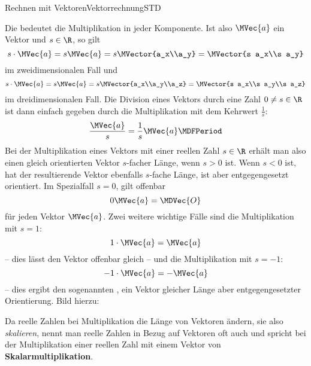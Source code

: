 \begin{MXContent}{Rechnen mit Vektoren}{Vektorrechnung}{STD}
\begin{MInfo}
Die  bedeutet die Multiplikation in jeder Komponente. Ist also $\MVec{a}$ ein Vektor und $s\in\R$, so gilt
\[
 s\cdot\MVec{a} = s\MVec{a}=s\MVector{a_x\\a_y} = \MVector{s a_x\\s a_y}
\]
im zweidimensionalen Fall und
\[
 s\cdot\MVec{a} = s\MVec{a}=s\MVector{a_x\\a_y\\a_z} = \MVector{s a_x\\s a_y\\s a_z}
\]
im dreidimensionalen Fall. Die Division eines Vektors durch eine Zahl $0\neq s\in\R$ ist dann einfach gegeben durch die Multiplikation mit dem Kehrwert $\frac{1}{s}$:
\[
 \frac{\MVec{a}}{s}=\frac{1}{s}\MVec{a}\MDFPeriod 
\]
Bei der Multiplikation eines Vektors mit einer reellen Zahl $s\in\R$ erhält man also einen gleich orientierten Vektor $s$-facher Länge, wenn $s>0$ ist. Wenn $s<0$ ist, hat der resultierende Vektor ebenfalls $s$-fache Länge, ist aber entgegengesetzt orientiert. Im Spezialfall $s=0$, gilt offenbar \[0\MVec{a}=\MDVec{O}\] für jeden Vektor $\MVec{a}$. Zwei weitere wichtige Fälle sind die Multiplikation mit $s=1$: \[1\cdot\MVec{a}=\MVec{a}\] -- dies lässt den Vektor offenbar gleich -- und die Multiplikation mit $s=-1$: \[-1\cdot\MVec{a}=-\MVec{a}\] -- dies ergibt den sogenannten , ein Vektor gleicher Länge aber entgegengesetzter Orientierung. Bild hierzu:
\begin{center}
% 
\end{center}
Da reelle Zahlen bei Multiplikation die Länge von Vektoren ändern, sie also \textit{skalieren}, nennt man reelle Zahlen in Bezug auf Vektoren oft auch  und spricht bei der Multiplikation einer reellen Zahl mit einem Vektor von \textbf{Skalarmultiplikation}. 
\end{MInfo}


\end{MXContent}
